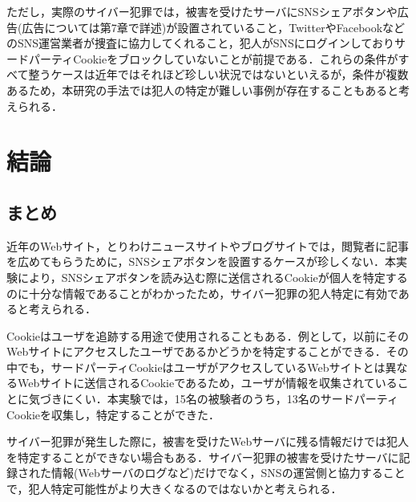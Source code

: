 \documentclass[10pt, a4paper]{jreport}
\begin{document}
ただし，実際のサイバー犯罪では，被害を受けたサーバにSNSシェアボタンや広告(広告については第7章で詳述)が設置されていること，TwitterやFacebookなどのSNS運営業者が捜査に協力してくれること，犯人がSNSにログインしておりサードパーティCookieをブロックしていないことが前提である．これらの条件がすべて整うケースは近年ではそれほど珍しい状況ではないといえるが，条件が複数あるため，本研究の手法では犯人の特定が難しい事例が存在することもあると考えられる．


























\chapter{結論}
\section{まとめ}
近年のWebサイト，とりわけニュースサイトやブログサイトでは，閲覧者に記事を広めてもらうために，SNSシェアボタンを設置するケースが珍しくない．本実験により，SNSシェアボタンを読み込む際に送信されるCookieが個人を特定するのに十分な情報であることがわかったため，サイバー犯罪の犯人特定に有効であると考えられる．

Cookieはユーザを追跡する用途で使用されることもある．例として，以前にそのWebサイトにアクセスしたユーザであるかどうかを特定することができる．その中でも，サードパーティCookieはユーザがアクセスしているWebサイトとは異なるWebサイトに送信されるCookieであるため，ユーザが情報を収集されていることに気づきにくい．本実験では，15名の被験者のうち，13名のサードパーティCookieを収集し，特定することができた．

サイバー犯罪が発生した際に，被害を受けたWebサーバに残る情報だけでは犯人を特定することができない場合もある．サイバー犯罪の被害を受けたサーバに記録された情報(Webサーバのログなど)だけでなく，SNSの運営側と協力することで，犯人特定可能性がより大きくなるのではないかと考えられる．
\end{document}

